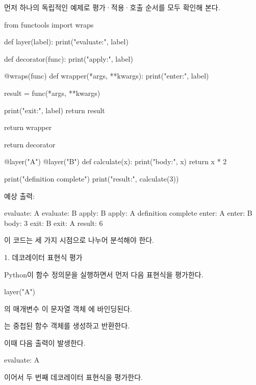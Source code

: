 먼저 하나의 독립적인 예제로 평가·적용·호출 순서를 모두 확인해 본다.

\begin{dhkcode}
from functools import wraps

def layer(label):
    print("evaluate:", label)

    def decorator(func):
        print("apply:", label)

        @wraps(func)
        def wrapper(*args, **kwargs):
            print("enter:", label)

            result = func(*args, **kwargs)

            print("exit:", label)
            return result

        return wrapper

    return decorator


@layer("A")
@layer("B")
def calculate(x):
    print("body:", x)
    return x * 2


print("definition complete")
print("result:", calculate(3))
\end{dhkcode}

예상 출력:

\begin{dhkzsh}
evaluate: A
evaluate: B
apply: B
apply: A
definition complete
enter: A
enter: B
body: 3
exit: B
exit: A
result: 6
\end{dhkzsh}

이 코드는 세 가지 시점으로 나누어 분석해야 한다.

\begin{dhknote}
\begin{dhksmry}[centered]
1. 데코레이터 표현식 평가
\end{dhksmry}
\end{dhknote}

Python이 함수 정의문을 실행하면서 먼저 다음 표현식을 평가한다.

\begin{dhkcode}
layer("A")
\end{dhkcode}

의 매개변수 이 문자열 객체 에 바인딩된다.

는 중첩된  함수 객체를 생성하고 반환한다.

이때 다음 출력이 발생한다.

\begin{dhkzsh}
evaluate: A
\end{dhkzsh}

이어서 두 번째 데코레이터 표현식을 평가한다.

